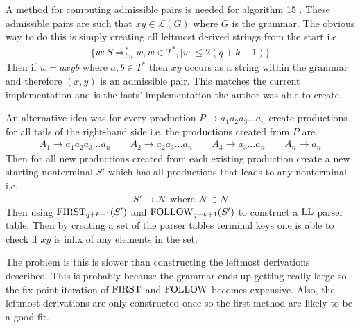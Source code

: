 A method for computing admissible pairs is needed for algorithm 15 \cite[15]{Vagner2007}. These admissible pairs are such that $xy \in \mathcal{L}(G)$ where $G$ is the grammar. The obvious way to do this is simply creating all leftmost derived strings from the start i.e.
\begin{align*}
    \{w : S \Rightarrow_{lm}^* w, w \in T^*, |w| \leq 2 (q + k + 1)\}
\end{align*}
Then if $w = axyb$ where $a, b \in T^*$ then $xy$ occurs as a string within the grammar and therefore $(x, y)$ is an admissible pair. This matches the current implementation and is the fasts' implementation the author was able to create.

An alternative idea was for every production $P \to a_{1}a_{2}a_{3} \dots a_{n}$ create productions for all tails of the right-hand side i.e. the productions created from $P$ are.
\begin{gather*}
    A_{1} \to a_{1}a_{2}a_{3} \dots a_{n} \qquad A_{2} \to a_{2}a_{3} \dots a_{n} \qquad A_{3} \to a_{3} \dots a_{n} \qquad A_{n} \to  a_{n}
\end{gather*}
Then for all new productions created from each existing production create a new starting nonterminal $S'$ which has all productions that leads to any nonterminal i.e.
\begin{align*}
    S' \to  \mathcal{N} \text{ where } \mathcal{N} \in N
\end{align*}
Then using $\text{FIRST}_{q + k + 1}(S')$ and $\text{FOLLOW}_{q + k + 1}(S')$ to construct a $\text{LL}$ parser table. Then by creating a set of the parser tables terminal keys one is able to check if $xy$ is infix of any elements in the set.

The problem is this is slower than constructing the leftmost derivations described. This is probably because the grammar ends up getting really large so the fix point iteration of $\text{FIRST}$ and $\text{FOLLOW}$ becomes expensive. Also, the leftmost derivations are only constructed once so the first method are likely to be a good fit.